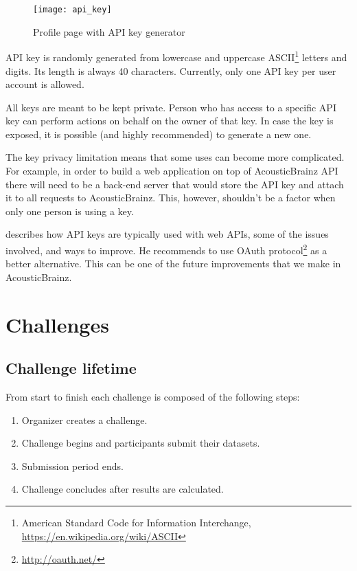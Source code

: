 \begin{figure}[h]
  \centering
  \texttt{[image: api\_key]}
    \caption{Profile page with API key generator}
    \label{fig:api_key}
\end{figure}

API key is randomly generated from lowercase and uppercase ASCII\footnote{American Standard Code for Information Interchange, \url{https://en.wikipedia.org/wiki/ASCII}} letters and digits. Its length is always 40 characters. Currently, only one API key per user account is allowed.

All keys are meant to be kept private. Person who has access to a specific API key can perform actions on behalf on the owner of that key. In case the key is exposed, it is possible (and highly recommended) to generate a new one.

The key privacy limitation means that some uses can become more complicated. For example, in order to build a web application on top of AcousticBrainz API there will need to be a back-end server that would store the API key and attach it to all requests to AcousticBrainz. This, however, shouldn't be a factor when only one person is using a key.

\cite{farrell2009api} describes how API keys are typically used with web APIs, some of the issues involved, and ways to improve. He recommends to use OAuth protocol\footnote{\url{http://oauth.net/}} as a better alternative. This can be one of the future improvements that we make in AcousticBrainz.


\section{Challenges}

\subsection{Challenge lifetime}

From start to finish each challenge is composed of the following steps:
\begin{enumerate}
    \item Organizer creates a challenge.
    \item Challenge begins and participants submit their datasets.
    \item Submission period ends.
    \item Challenge concludes after results are calculated.
\end{enumerate}

